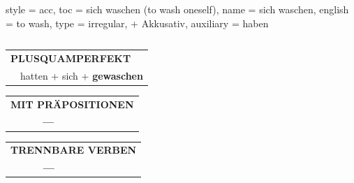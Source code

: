 \begin{verbentry}{
  style = {acc},
  toc = {sich waschen (to wash oneself)},
  name = {sich waschen},
  english = {to wash},
  type = {irregular, + Akkusativ},
  auxiliary = {haben}
}
\begin{tabular}{rl}
  \end{tabular}
\hfill
   \begin{tabular}{rl}
      \multicolumn{2}{l}{\textbf{PLUSQUAMPERFEKT}}\\
    &hatten + sich + \textbf{gewaschen}\\
  \end{tabular}
  
\vspace{10pt}

\begin{tabular}{lll}
\multicolumn{3}{l}{\textbf{MIT PRÄPOSITIONEN}}\\
& \textbf{---} & \\
\end{tabular}
\hfill
\begin{tabular}{lll}
\multicolumn{3}{l}{\textbf{TRENNBARE VERBEN}}\\
& \textbf{---} & \\
\end{tabular}

\vspace{-5pt}
\end{verbentry}

